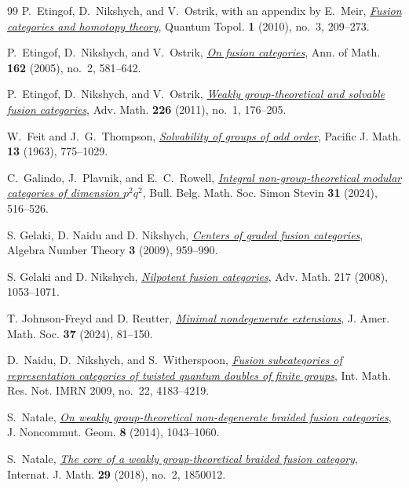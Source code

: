 \documentclass[11pt,a4paper]{article}
\numberwithin{equation}{section}
\theoremstyle{remark}
\begin{document}
\begin{thebibliography}{99}
P.~Etingof, D.~Nikshych, and V.~Ostrik, with an appendix by E.~Meir,
\href{https://doi.org/10.4171/QT/6}{\emph{Fusion categories and homotopy theory}}, Quantum Topol.
\textbf{1} (2010), no.~3, 209--273.

P.~Etingof, D.~Nikshych, and V.~Ostrik,
\href{https://doi.org/10.4007/annals.2005.162.581}{\emph{On fusion categories}},
Ann. of Math. \textbf{162} (2005), no.~2, 581--642.

P.~Etingof, D.~Nikshych, and V.~Ostrik,
\href{https://doi.org/10.1016/j.aim.2010.06.009}{\emph{Weakly group-theoretical and solvable fusion categories}},
Adv. Math. \textbf{226} (2011), no.~1, 176--205.

W.~Feit and J.~G.~Thompson,
\href{https://msp.org/pjm/1963/13-3/pjm-v13-n3-s.pdf}{\emph{Solvability of groups of odd order}}, Pacific J. Math.
\textbf{13} (1963), 775--1029.

C.~Galindo, J.~Plavnik, and E.~C.~Rowell,
\href{https://doi.org/10.36045/j.bbms.240415}{\emph{Integral non-group-theoretical modular categories of dimension
$p^2q^2$}}, Bull. Belg. Math. Soc. Simon Stevin \textbf{31} (2024),
516--526.

S. Gelaki, D. Naidu and D. Nikshych,
\href{https://msp.org/ant/2009/3-8/ant-v3-n8-p05-s.pdf}{\emph{Centers of graded fusion categories}},
Algebra Number Theory \textbf{3} (2009), 959--990.

S. Gelaki and D. Nikshych, \href{https://doi.org/10.1016/j.aim.2007.08.001}{\emph{Nilpotent fusion categories}}, Adv. Math. 217 (2008), 1053--1071.

T. Johnson-Freyd and D. Reutter, \href{https://doi.org/10.1090/jams/1023}{\emph{Minimal nondegenerate extensions}}, J. Amer. Math. Soc. \textbf{37} (2024), 81--150.

D.~Naidu, D.~Nikshych, and S.~Witherspoon,
\href{https://doi.org/10.1093/imrn/rnp084}{\emph{Fusion subcategories of representation categories of twisted
quantum doubles of finite groups}}, Int. Math. Res. Not. IMRN
2009, no.~22, 4183--4219.

S.~Natale,
\href{https://doi.org/10.4171/jncg/177}{\emph{On weakly group-theoretical non-degenerate braided fusion categories}},
J. Noncommut. Geom. \textbf{8} (2014), 1043--1060.

S.~Natale,
\href{https://doi.org/10.1142/S0129167X1850012X}{\emph{The core of a weakly group-theoretical braided fusion category}},
Internat. J. Math. \textbf{29} (2018), no.~2, 1850012.


\end{thebibliography}
\end{document}

